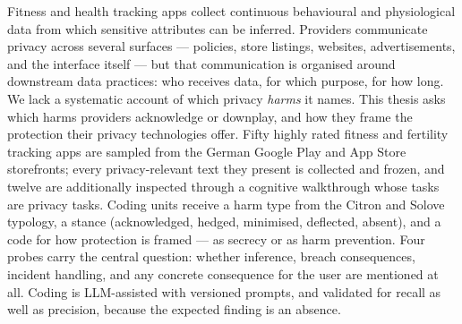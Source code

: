 Fitness and health tracking apps collect continuous behavioural and
physiological data from which sensitive attributes can be inferred. Providers
communicate privacy across several surfaces --- policies, store listings,
websites, advertisements, and the interface itself --- but that communication is
organised around downstream data practices: who receives data, for which
purpose, for how long. We lack a systematic account of which privacy
\emph{harms} it names. This thesis asks which harms providers acknowledge or
downplay, and how they frame the protection their privacy technologies offer.
Fifty highly rated fitness and fertility tracking apps are sampled from the
German Google Play and App Store storefronts; every privacy-relevant text they
present is collected and frozen, and twelve are additionally inspected through a
cognitive walkthrough whose tasks are privacy tasks. Coding units receive a harm
type from the Citron and Solove typology, a stance (acknowledged, hedged,
minimised, deflected, absent), and a code for how protection is framed --- as
secrecy or as harm prevention. Four probes carry the central question: whether
inference, breach consequences, incident handling, and any concrete consequence
for the user are mentioned at all. Coding is LLM-assisted with versioned
prompts, and validated for recall as well as precision, because the expected
finding is an absence.
